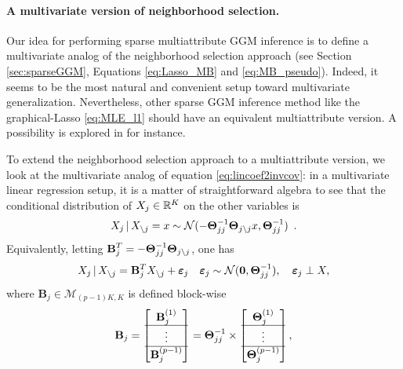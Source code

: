 \paragraph*{A multivariate version of neighborhood selection.}  Our
idea for performing sparse multiattribute GGM inference is to define
a multivariate analog of the neighborhood selection approach
\cite{2006_AS_Meinshausen} (see Section \ref{sec:sparseGGM}, Equations
\eqref{eq:Lasso_MB} and \eqref{eq:MB_pseudo}). Indeed, it seems to be
the most natural and convenient setup toward multivariate
generalization.  Nevertheless, other sparse GGM inference method like
the graphical-Lasso \eqref{eq:MLE_l1} should have an equivalent
multiattribute version. A possibility is explored in
\cite{kolar2014graph} for instance.

To extend the neighborhood selection approach to a multiattribute
version, we look at the multivariate analog of equation
\eqref{eq:lincoef2invcov}: in a multivariate linear regression setup,
it is a matter of straightforward algebra to see that the conditional
distribution of $X_j\in\mathbb{R}^K$ on the other variables is
\begin{equation*}
  X_j \, |\,  X_{\backslash j}  = x \sim  \mathcal{N}(- \boldsymbol\Theta_{jj}^{-1}\boldsymbol\Theta_{j
    \backslash j} x , \boldsymbol\Theta_{jj}^{-1})\enskip.
\end{equation*} 
Equivalently,     letting      $\displaystyle     \mathbf{B}_j^T     =
-\boldsymbol\Theta_{jj}^{-1} \boldsymbol\Theta_{j\backslash j}$, one has
\begin{equation*}
  X_j \, |\, X_{\backslash j} = \mathbf{B}_j^T X_{\backslash j} +
  \boldsymbol\varepsilon_j \quad \boldsymbol\varepsilon_j
  \sim \mathcal{N}(\mathbf{0},\boldsymbol\Theta_{jj}^{-1}), \quad \boldsymbol\varepsilon_j \perp X,
\end{equation*}
where $\mathbf{B}_j\in\mathcal{M}_{(p-1)K,K}$ is defined block-wise
\begin{equation*}
  \mathbf{B}_j = \begin{bmatrix}
    \mathbf{B}_j^{(1)} \\ \hline
    \vdots \\ \hline
    \mathbf{B}_j^{(p-1)} \\ 
  \end{bmatrix} = \boldsymbol\Theta_{jj}^{-1} \times \begin{bmatrix}
    \boldsymbol\Theta_j^{(1)} \\ \hline
    \vdots \\ \hline
    \boldsymbol\Theta_j^{(p-1)} \\ 
  \end{bmatrix},
\end{equation*}
